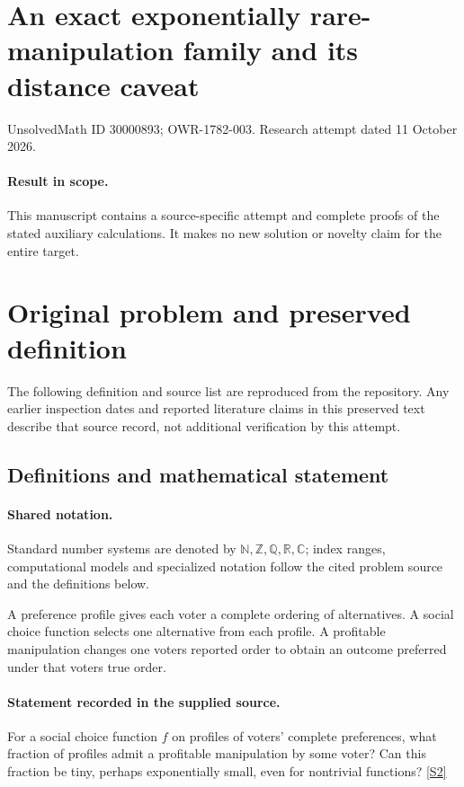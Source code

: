 \documentclass[11pt]{article}
\begin{document}
\section*{An exact exponentially rare-manipulation family and its distance caveat}
\noindent UnsolvedMath ID 30000893; OWR-1782-003. Research attempt dated 11 October 2026.
\paragraph{Result in scope.}This manuscript contains a source-specific attempt and complete proofs of the stated auxiliary calculations. It makes no new solution or novelty claim for the entire target.
\section{Original problem and preserved definition}
The following definition and source list are reproduced from the repository. Any earlier inspection dates and reported literature claims in this preserved text describe that source record, not additional verification by this attempt.
\subsection{Definitions and mathematical statement}

\paragraph{Shared notation.}Standard number systems are denoted by $\mathbb N,\mathbb Z,\mathbb Q,\mathbb R,\mathbb C$; index ranges, computational models and specialized notation follow the cited problem source and the definitions below.


A preference profile gives each voter a complete ordering of alternatives. A social choice function selects one alternative from each profile. A profitable manipulation changes one voter\textquotesingle s reported order to obtain an outcome preferred under that voter\textquotesingle s true order.
\paragraph{Statement recorded in the supplied source.}
For a social choice function $f$ on profiles of voters' complete preferences, what fraction of profiles admit a profitable manipulation by some voter? Can this fraction be tiny, perhaps exponentially small, even for nontrivial functions? \href{https://doi.org/10.4171/owr/2008/01}{[S2]}
\end{document}
